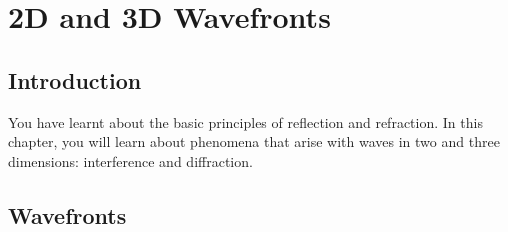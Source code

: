 \chapter{2D and 3D Wavefronts}
\label{p:wsl:2d3d12}

\section{Introduction}
You have learnt about the basic principles of reflection and refraction. In this chapter, you will learn about phenomena that arise with waves in two and three dimensions: interference and diffraction. 

\section{Wavefronts}

